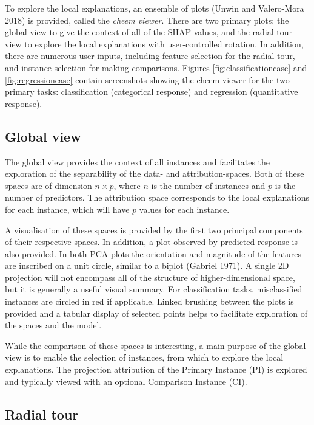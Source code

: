 \documentclass[
]{article}
\begin{document}
To explore the local explanations, an ensemble of plots (Unwin and Valero-Mora 2018) is provided, called the \emph{cheem viewer}. There are two primary plots: the global view to give the context of all of the SHAP values, and the radial tour view to explore the local explanations with user-controlled rotation. In addition, there are numerous user inputs, including feature selection for the radial tour, and instance selection for making comparisons. Figures \ref{fig:classificationcase} and \ref{fig:regressioncase} contain screenshots showing the cheem viewer for the two primary tasks: classification (categorical response) and regression (quantitative response).

\hypertarget{global-view}{%
\subsection{Global view}\label{global-view}}

The global view provides the context of all instances and facilitates the exploration of the separability of the data- and attribution-spaces. Both of these spaces are of dimension \(n\times p\), where \(n\) is the number of instances and \(p\) is the number of predictors. The attribution space corresponds to the local explanations for each instance, which will have \(p\) values for each instance.

A visualisation of these spaces is provided by the first two principal components of their respective spaces. In addition, a plot observed by predicted response is also provided. In both PCA plots the orientation and magnitude of the features are inscribed on a unit circle, similar to a biplot (Gabriel 1971). A single 2D projection will not encompass all of the structure of higher-dimensional space, but it is generally a useful visual summary. For classification tasks, misclassified instances are circled in red if applicable. Linked brushing between the plots is provided and a tabular display of selected points helps to facilitate exploration of the spaces and the model.

While the comparison of these spaces is interesting, a main purpose of the global view is to enable the selection of instances, from which to explore the local explanations. The projection attribution of the Primary Instance (PI) is explored and typically viewed with an optional Comparison Instance (CI).

\hypertarget{radial-tour}{%
\subsection{Radial tour}\label{radial-tour}}
\end{document}
